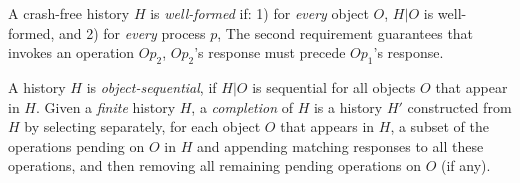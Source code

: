 A crash-free history $H$ is \emph{well-formed} if: 1) for {\em every} object $O$, $H | O$ is well-formed,
and 2) for {\em every} process $p$, 
The second requirement guarantees that 
invokes an operation $Op_2$,
$Op_2$'s response must precede $Op_1$'s response.

%
%
A history $H$ is \textit{object-sequential}, if $H | O$ is sequential for all objects $O$ that appear in $H$.
Given a {\em finite} history $H$, a \textit{completion} of $H$ is a history $H'$ constructed from $H$ by selecting separately,
for each object $O$ that appears in $H$, a subset of the operations pending on $O$ in $H$
and appending matching responses to all these operations,
and then removing all remaining pending operations on $O$ (if any).

